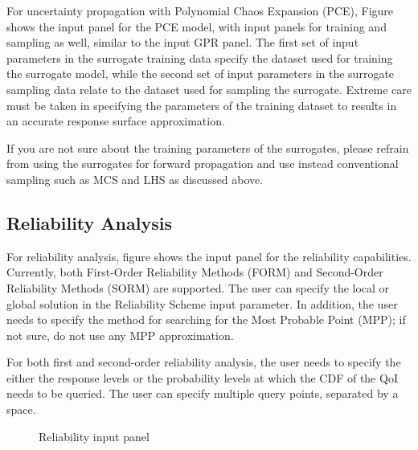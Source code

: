 For uncertainty propagation with Polynomial Chaos Expansion (PCE), Figure  shows the input panel for the PCE model, with input panels for training and sampling as well, similar to the input GPR panel. The first set of input parameters in the surrogate training data specify the dataset used for training the surrogate model, while the second set of input parameters in the surrogate sampling data relate to the dataset used for sampling the surrogate. Extreme care must be taken in specifying the parameters of the training dataset to results in an accurate response surface approximation. 

If you are not sure about the training parameters of the surrogates, please refrain from using the surrogates for forward propagation and use instead conventional sampling such as MCS and LHS as discussed above. 

\subsection{Reliability Analysis}

For reliability analysis, figure  shows the input panel for the reliability capabilities. Currently, both First-Order Reliability Methods (FORM) and Second-Order Reliability Methods (SORM) are supported. The user can specify the local or global solution in the Reliability Scheme input parameter. In addition, the user needs to specify the method for searching for the Most Probable Point (MPP); if not sure, do not use any MPP approximation. 

For both first and second-order reliability analysis, the user needs to specify the either the response levels or the probability levels at which the CDF of the QoI needs to be queried. The user can specify multiple query points, separated by a space. 


\begin{figure}[!htbp]
  \caption{Reliability input panel}
  \label{fig:rel}
\end{figure}


